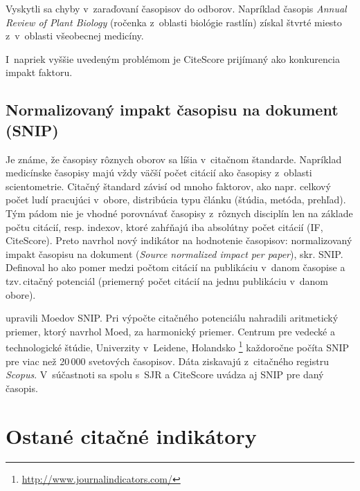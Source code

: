 Vyskytli sa chyby v~zaraďovaní časopisov do odborov. Napríklad časopis \emph{Annual
Review of Plant Biology} (ročenka z~oblasti biológie rastlín) získal štvrté miesto
z~v~oblasti všeobecnej medicíny.

I~napriek vyššie uvedeným problémom je CiteScore prijímaný ako konkurencia impakt faktoru.

\subsection{Normalizovaný impakt časopisu na dokument (SNIP)}
\label{sec:snip}

Je známe, že časopisy rôznych oborov sa líšia v~citačnom štandarde.  Napríklad
medicínske časopisy majú vždy väčší počet citácií ako časopisy z~oblasti
scientometrie. Citačný štandard závisí od mnoho faktorov, ako napr.  celkový
počet ludí pracujúci v~obore, distribúcia typu článku (štúdia, metóda,
prehľad).  Tým pádom nie je vhodné porovnávať časopisy z~rôznych disciplín len
na základe počtu citácií, resp. indexov, ktoré zahŕňajú iba absolútny počet
citácií (IF, CiteScore).  Preto \citet{Moed2010} navrhol nový indikátor na
hodnotenie časopisov: normalizovaný impakt časopisu na dokument (\emph{Source
normalized impact per paper}), skr. SNIP. Definoval ho ako pomer medzi počtom
citácií na publikáciu v~danom časopise a tzv.\,citačný potenciál (priemerný
počet citácií na jednu publikáciu v~danom obore).

\citet{Waltman2013} upravili Moedov SNIP. Pri výpočte citačného potenciálu
nahradili aritmetický priemer, ktorý navrhol Moed, za harmonický priemer.
Centrum pre vedecké a technologické štúdie, Univerzity v~Leidene, Holandsko
\footnote{\url{http://www.journalindicators.com/}} každoročne počíta SNIP pre
viac než 20\,000 svetových časopisov.  Dáta ziskavajú z~citačného registru
\emph{Scopus}. V~súčastnoti sa spolu s~SJR a CiteScore uvádza aj SNIP pre daný
časopis.

\section{Ostané citačné indikátory}

